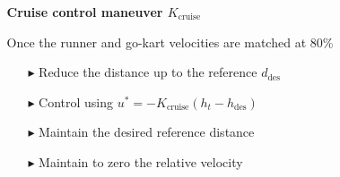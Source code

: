 \documentclass[9pt, aspectratio=169]{beamer}
\begin{document}
\begin{frame}
\begin{columns}
\begin{column}{0.5\textwidth}
\end{column}
\begin{column}{0.5\textwidth}
\vspace{0.3cm}
\begin{block}{}
\centering
\textbf{Cruise control maneuver $K_\text{cruise}$} \\
\end{block}
Once the runner and go-kart velocities are matched at 80\%
\begin{itemize}
\vspace{0.1cm}
\footnotesize
	\item[$\blacktriangleright$] Reduce the distance up to the reference $d_\text{des}$
	\item[$\blacktriangleright$] Control using $u^* = - K_\text{cruise} (h_t - h_{\text{des}}) $
	\item[$\blacktriangleright$] Maintain the desired reference distance
	\item[$\blacktriangleright$] Maintain to zero the relative velocity
\end {itemize}
\end{column}
\end{columns}

\end{frame}
\end{document}
